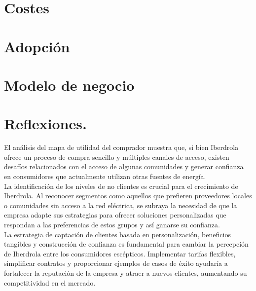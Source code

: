 \documentclass{article}
\begin{document}
\section{Costes}
\section{Adopción}
\section{Modelo de negocio}

\section{Reflexiones.}
El análisis del mapa de utilidad del comprador muestra que, si bien Iberdrola ofrece un proceso de compra sencillo y múltiples canales de acceso, existen desafíos relacionados con el acceso de algunas comunidades y generar confianza en consumidores que actualmente utilizan otras fuentes de energía.
\\

La identificación de los niveles de no clientes es crucial para el crecimiento de Iberdrola. Al reconocer segmentos como aquellos que prefieren proveedores locales o comunidades sin acceso a la red eléctrica, se subraya la necesidad de que la empresa adapte sus estrategias para ofrecer soluciones personalizadas que respondan a las preferencias de estos grupos y así ganarse su confianza.
\\

La estrategia de captación de clientes basada en personalización, beneficios tangibles y construcción de confianza es fundamental para cambiar la percepción de Iberdrola entre los consumidores escépticos. Implementar tarifas flexibles, simplificar contratos y proporcionar ejemplos de casos de éxito ayudaría a fortalecer la reputación de la empresa y atraer a nuevos clientes, aumentando su competitividad en el mercado.
\newpage

\newpage
\end{document}
